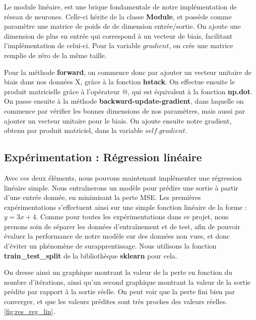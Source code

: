 \documentclass{article}
\begin{document}
Le module linéaire, est une brique fondamentale de notre implémentation de réseau de neurones. Celle-ci hérite de la classe \textbf{Module}, et possède comme paramètre une matrice de poids de de dimension entrée/sortie. On ajoute une dimension de plus en entrée qui correspond à un vecteur de biais, facilitant l'implémentation de celui-ci. Pour la variable $gradient$, on crée une matrice remplie de zéro de la même taille.

Pour la méthode \textbf{forward}, on commence donc par ajouter un vecteur unitaire de biais dans nos données X, grâce à la fonction \textbf{hstack}. On effectue ensuite le produit matricielle grâce à l'opérateur $@$, qui est équivalent à la fonction \textbf{np.dot}.\\
On passe ensuite à la méthode \textbf{backward-update-gradient}, dans laquelle on commence par vérifier les bonnes dimensions de nos paramètres, mais aussi par ajouter un vecteur unitaire pour le biais. On ajoute ensuite notre gradient, obtenu par produit matriciel, dans la variable $self.gradient$.

\subsection{Expérimentation : Régression linéaire}

Avec ces deux éléments, nous pouvons maintenant implémenter une régression linéaire simple. Nous entraînerons un modèle pour prédire une sortie à partir d'une entrée donnée, en minimisant la perte MSE. Les premières expérimentations s'effectuent ainsi sur une simple fonction linéaire de la forme : $y=3x+4$. Comme pour toutes les expérimentations dans ce projet, nous prenons soin de séparer les données d'entraînement et de test, afin de pouvoir évaluer la performance de notre modèle sur des données non vues, et donc d'éviter un phénomène de surapprentissage. Nous utilisons la fonction \textbf{train\_test\_split} de la bibliothèque \textbf{sklearn} pour cela.

On dresse ainsi un graphique montrant la valeur de la perte en fonction du nombre d'itérations, ainsi qu'un second graphique montrant la valeur de la sortie prédite par rapport à la sortie réelle. On peut voir que la perte fini bien par converger, et que les valeurs prédites sont très proches des valeurs réelles. \ref{fig:res_reg_lin}.
\end{document}
